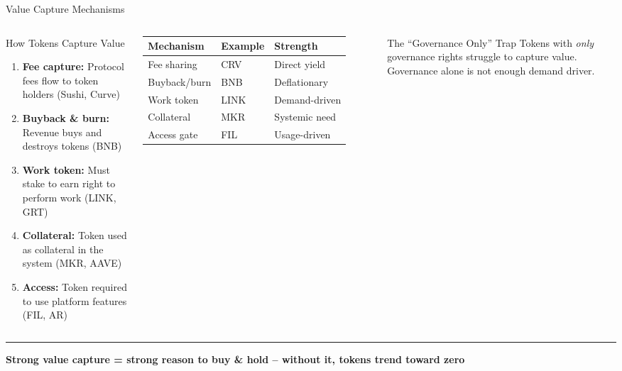 \documentclass[8pt,aspectratio=169]{beamer}
\newcommand{\bottomnote}[1]{\vfill\vspace{-2mm}\textcolor{mllavender2}{\rule{\textwidth}{0.4pt}}\vspace{1mm}\footnotesize\textbf{#1}}
\begin{document}
\begin{frame}{Value Capture Mechanisms}
\begin{columns}[T]
\begin{block}{How Tokens Capture Value}
\footnotesize
\begin{enumerate}
  \item \textbf{Fee capture:} Protocol fees flow to token holders (Sushi, Curve)
  \item \textbf{Buyback \& burn:} Revenue buys and destroys tokens (BNB)
  \item \textbf{Work token:} Must stake to earn right to perform work (LINK, GRT)
  \item \textbf{Collateral:} Token used as collateral in the system (MKR, AAVE)
  \item \textbf{Access:} Token required to use platform features (FIL, AR)
\end{enumerate}
\end{block}

\footnotesize
\begin{tabular}{lll}
\toprule
\textbf{Mechanism} & \textbf{Example} & \textbf{Strength} \\
\midrule
Fee sharing & CRV & Direct yield \\
Buyback/burn & BNB & Deflationary \\
Work token & LINK & Demand-driven \\
Collateral & MKR & Systemic need \\
Access gate & FIL & Usage-driven \\
\bottomrule
\end{tabular}
\vspace{3mm}
\begin{alertblock}{\footnotesize The ``Governance Only'' Trap}
\footnotesize
Tokens with \textit{only} governance rights struggle to capture value. Governance alone is not enough demand driver.
\end{alertblock}
\end{columns}
\bottomnote{Strong value capture = strong reason to buy \& hold -- without it, tokens trend toward zero}
\end{frame}
\end{document}
